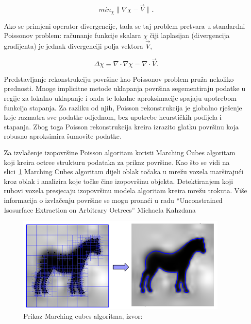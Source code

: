\begin{equation*}
min_\chi \|\nabla\chi - \vec{V}\|.
\end{equation*}

Ako se primjeni operator divergencije, tada se taj problem pretvara u
standardni Poissonov problem: računanje funkcije skalara \(\chi\) čiji
laplasijan (divergencija gradijenta) je jednak divergenciji polja
vektora \(\vec{V}\),

\begin{equation*}
\Delta \chi \equiv \nabla \cdot \nabla\chi = \nabla \cdot \vec{V}.
\end{equation*}

Predstavljanje rekonstrukciju površine kao Poissonov problem pruža
nekoliko prednosti. Mnoge implicitne metode uklapanja površina
segementiraju podatke u regije za lokalno uklapanje i onda te lokalne
aproksimacije spajaju upotrebom funkcija stapanja. Za razliku od njih,
Poisson rekonstrukcija je globalno rješenje koje razmatra sve podatke
odjednom, bez upotrebe heurstičkih podijela i stapanja. Zbog toga
Poisson rekonstrukcija kreira izrazito glatku površinu koja robusno
aproksimira šumovite podatke.  

Za izvlačenje izopovršine Poisson algoritam koristi Marching Cubes
algoritam~\cite{Lorensen87marchingcubes} koji kreira octree strukturu
podataka za prikaz površine.  Kao što se vidi na
slici~\ref{fig:poisson-marching-cubes.png} Marching Cubes algoritam
dijeli oblak točaka u mrežu voxela marširajući kroz oblak i analizira
koje točke čine izopovršinu objekta.  Detektiranjem koji rubovi voxela
presjecaju izopovršinu modela algoritam kreira mrežu trokuta. Više
informacija o izvlačenju površine se mogu pronaći u radu “Unconstrained
Isosurface Extraction on Arbitrary Octrees” Michaela
Kahzdana~\cite{Kazhdan:2007}

\begin{figure}[h]
\centering
\includegraphics[scale=0.8]{figures/poisson-marching-cubes.png}
\caption[]{Prikaz Marching cubes algoritma, izvor:~\cite{Kazhdan:2007}}
\label{fig:poisson-marching-cubes.png}
\end{figure}

